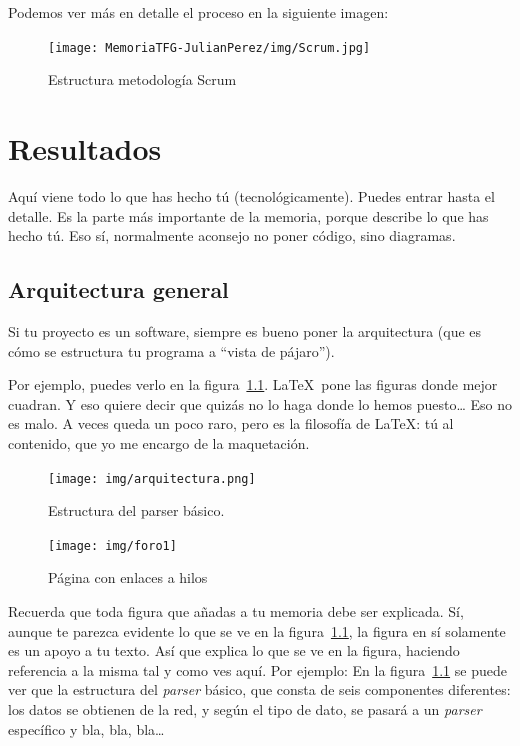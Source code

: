 \documentclass[a4paper, 12pt]{book}
\begin{document}
Podemos ver más en detalle el proceso en la siguiente imagen:
\begin{figure}[H]
  \centering
  \texttt{[image: MemoriaTFG-JulianPerez/img/Scrum.jpg]}
  \caption{Estructura metodología Scrum}\label{scrum}
\end{figure}


\cleardoublepage
\chapter{Resultados}

Aquí viene todo lo que has hecho tú (tecnológicamente). 
Puedes entrar hasta el detalle. 
Es la parte más importante de la memoria, porque describe lo que has hecho tú.
Eso sí, normalmente aconsejo no poner código, sino diagramas.

\section{Arquitectura general} 
\label{sec:arquitectura}

Si tu proyecto es un software, siempre es bueno poner la arquitectura (que es cómo se estructura tu programa a ``vista de pájaro'').

Por ejemplo, puedes verlo en la figura~\ref{fig:arquitectura}.
\LaTeX \ pone las figuras donde mejor cuadran. 
Y eso quiere decir que quizás no lo haga donde lo hemos puesto\ldots
Eso no es malo.
A veces queda un poco raro, pero es la filosofía de \LaTeX: tú al contenido, que yo me encargo de la maquetación.

\begin{figure}
  \centering
  \texttt{[image: img/arquitectura.png]}
  \caption{Estructura del parser básico.}\label{fig:arquitectura}
\end{figure}

\begin{figure}
    \centering
    \texttt{[image: img/foro1]}
    \caption{Página con enlaces a hilos}\label{fig:_arquitectura}
\end{figure}

 
Recuerda que toda figura que añadas a tu memoria debe ser explicada.
Sí, aunque te parezca evidente lo que se ve en la figura~\ref{fig:arquitectura}, la figura en sí solamente es un apoyo a tu texto.
Así que explica lo que se ve en la figura, haciendo referencia a la misma tal y como ves aquí.
Por ejemplo: En la figura~\ref{fig:arquitectura} se puede ver que la estructura del \emph{parser} básico, que consta de seis componentes diferentes: los datos se obtienen de la red, y según el tipo de dato, se pasará a un \emph{parser} específico y bla, bla, bla\ldots
\end{document}
